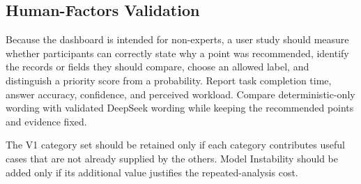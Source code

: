 \documentclass[11pt]{article}
\begin{document}
\subsection{Human-Factors Validation}

Because the dashboard is intended for non-experts, a user study should measure
whether participants can correctly state why a point was recommended, identify
the records or fields they should compare, choose an allowed label, and
distinguish a priority score from a probability. Report task completion time,
answer accuracy, confidence, and perceived workload. Compare deterministic-only
wording with validated DeepSeek wording while keeping the recommended points and
evidence fixed.

The V1 category set should be retained only if each category contributes useful
cases that are not already supplied by the others. Model Instability should be
added only if its additional value justifies the repeated-analysis cost.
\end{document}
